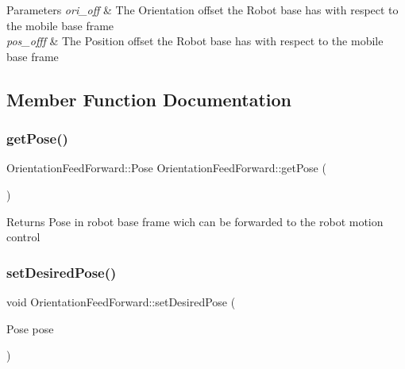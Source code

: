 \begin{DoxyParams}{Parameters}
{\em ori\+\_\+off} & The Orientation offset the Robot base has with respect to the mobile base frame \\
\hline
{\em pos\+\_\+offf} & The Position offset the Robot base has with respect to the mobile base frame \\
\hline
\end{DoxyParams}


\subsection{Member Function Documentation}
\mbox{\label{classOrientationFeedForward_ad31fce2cdf39cbf375457b9aa7ca2219}} 
\subsubsection{\texorpdfstring{get\+Pose()}{getPose()}}
{\footnotesize\ttfamily Orientation\+Feed\+Forward\+::\+Pose Orientation\+Feed\+Forward\+::get\+Pose (\begin{DoxyParamCaption}{ }\end{DoxyParamCaption})}

\begin{DoxyReturn}{Returns}
Pose in robot base frame wich can be forwarded to the robot motion control 
\end{DoxyReturn}
\mbox{\label{classOrientationFeedForward_a5f69dfd449972707d2ccd07e20fd2c5b}} 
\subsubsection{\texorpdfstring{set\+Desired\+Pose()}{setDesiredPose()}\hspace{0.1cm}{\footnotesize\ttfamily [1/2]}}
{\footnotesize\ttfamily void Orientation\+Feed\+Forward\+::set\+Desired\+Pose (\begin{DoxyParamCaption}\item[{Pose}]{pose }\end{DoxyParamCaption})}


